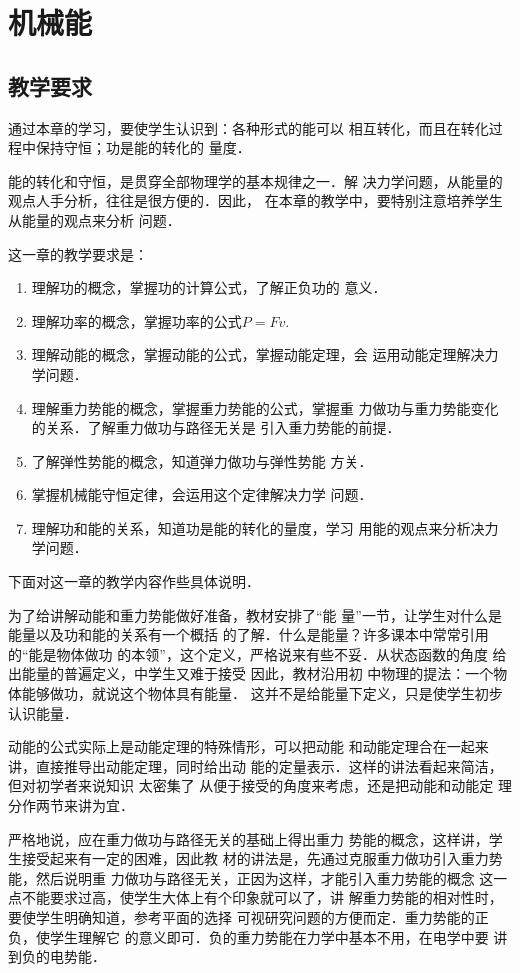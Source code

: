 
\chapter{机械能}\minitoc[n]
\section{教学要求}
通过本章的学习，要使学生认识到：各种形式的能可以
相互转化，而且在转化过程中保持守恒；功是能的转化的
量度．

能的转化和守恒，是贯穿全部物理学的基本规律之一．解
决力学问题，从能量的观点人手分析，往往是很方便的．因此，
在本章的教学中，要特别注意培养学生从能量的观点来分析
问题．

这一章的教学要求是：
\begin{enumerate}
\item 理解功的概念，掌握功的计算公式，了解正负功的
意义．
\item 理解功率的概念，掌握功率的公式$P=Fv$.
\item 理解动能的概念，掌握动能的公式，掌握动能定理，会
运用动能定理解决力学问题．
\item 理解重力势能的概念，掌握重力势能的公式，掌握重
力做功与重力势能变化的关系．了解重力做功与路径无关是
引入重力势能的前提．
\item 了解弹性势能的概念，知道弹力做功与弹性势能
方关．
\item 掌握机械能守恒定律，会运用这个定律解决力学
问题．
\item 理解功和能的关系，知道功是能的转化的量度，学习
用能的观点来分析决力学问题．
\end{enumerate}


下面对这一章的教学内容作些具体说明．

为了给讲解动能和重力势能做好准备，教材安排了“能
量”一节，让学生对什么是能量以及功和能的关系有一个概括
的了解．什么是能量？许多课本中常常引用的“能是物体做功
的本领”，这个定义，严格说来有些不妥．从状态函数的角度
给出能量的普遍定义，中学生又难于接受 因此，教材沿用初
中物理的提法：一个物体能够做功，就说这个物体具有能量．
这并不是给能量下定义，只是使学生初步认识能量．

动能的公式实际上是动能定理的特殊情形，可以把动能
和动能定理合在一起来讲，直接推导出动能定理，同时给出动
能的定量表示．这样的讲法看起来简洁，但对初学者来说知识
太密集了 从便于接受的角度来考虑，还是把动能和动能定
理分作两节来讲为宜．

严格地说，应在重力做功与路径无关的基础上得出重力
势能的概念，这样讲，学生接受起来有一定的困难，因此教
材的讲法是，先通过克服重力做功引入重力势能，然后说明重
力做功与路径无关，正因为这样，才能引入重力势能的概念
这一点不能要求过高，使学生大体上有个印象就可以了，讲
解重力势能的相对性时，要使学生明确知道，参考平面的选择
可视研究问题的方便而定．重力势能的正负，使学生理解它
的意义即可．负的重力势能在力学中基本不用，在电学中要
讲到负的电势能．

